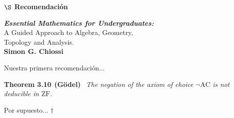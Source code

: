 


\begin{center}
    {\large \textbf{ $\S$ Recomendación}} {$~~$\small\faCoffee}
\end{center}
\vspace{0.14cm}

\begin{center}
    {\large\textit{\textbf{Essential Mathematics for Undergraduates:}}\\ \vspace{0.3cm}
    {\small A Guided Approach to Algebra, Geometry,\\ Topology and Analysis.}}\\
    \vspace{0.3cm}
    {\small \textbf{Simon G. Chiossi}}
\end{center}
\vspace{0.14cm}

{\small Nuestra primera recomendación...}
\vspace{0.2cm}

\noindent
{\small \textbf{Theorem 3.10$~~$(Gödel)} $~~$\textit{The negation of the axiom of choice $\neg \mathrm{AC}$ is not deducible in $\mathrm{ZF}$.}} 
\vspace{0.2cm}

{\small Por supuesto... $\dagger$}

